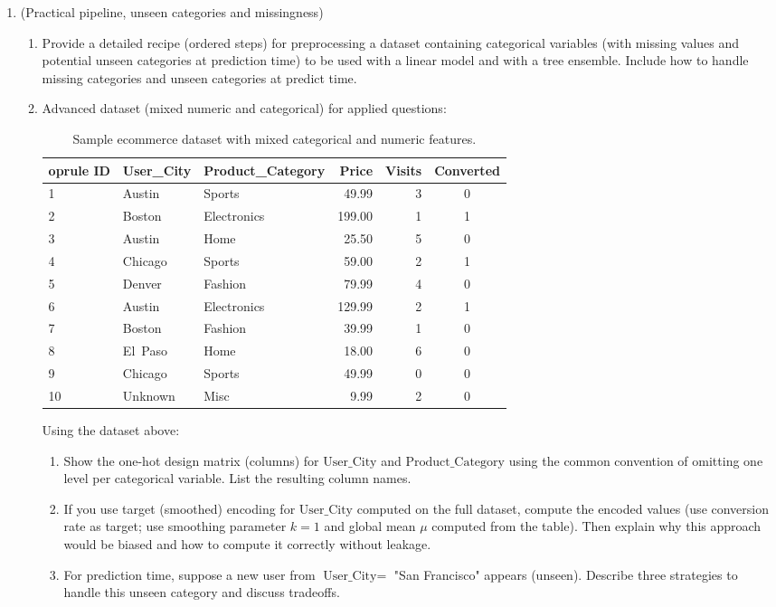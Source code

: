 \documentclass[12pt,a4paper]{article}
\begin{document}
\begin{enumerate}[label=(\arabic*)]
\item (Practical pipeline, unseen categories and missingness)
    \begin{enumerate}[label=(\alph*)]
    \item Provide a detailed recipe (ordered steps) for preprocessing a dataset containing categorical variables (with missing values and potential unseen categories at prediction time) to be used with a linear model and with a tree ensemble. Include how to handle missing categories and unseen categories at predict time.
    \item Advanced dataset (mixed numeric and categorical) for applied questions:
    \begin{table}[H]
    \centering
    \begin{tabular}{l l l r r c}
    	oprule
    ID & User\_City & Product\_Category & Price & Visits & Converted \\
    \midrule
    1 & Austin & Sports & 49.99 & 3 & 0 \\
    2 & Boston & Electronics & 199.00 & 1 & 1 \\
    3 & Austin & Home & 25.50 & 5 & 0 \\
    4 & Chicago & Sports & 59.00 & 2 & 1 \\
    5 & Denver & Fashion & 79.99 & 4 & 0 \\
    6 & Austin & Electronics & 129.99 & 2 & 1 \\
    7 & Boston & Fashion & 39.99 & 1 & 0 \\
    8 & El\ Paso & Home & 18.00 & 6 & 0 \\
    9 & Chicago & Sports & 49.99 & 0 & 0 \\
    10 & Unknown & Misc & 9.99 & 2 & 0 \\
    \bottomrule
    \end{tabular}
    \caption{Sample ecommerce dataset with mixed categorical and numeric features.}
    \end{table}
    Using the dataset above:
    \begin{enumerate}[label=(\roman*)]
    \item Show the one-hot design matrix (columns) for \(\text{User\_City}\) and \(\text{Product\_Category}\) using the common convention of omitting one level per categorical variable. List the resulting column names.
    \item If you use target (smoothed) encoding for \(\text{User\_City}\) computed on the full dataset, compute the encoded values (use conversion rate as target; use smoothing parameter \(k=1\) and global mean \(\mu\) computed from the table). Then explain why this approach would be biased and how to compute it correctly without leakage.
    \item For prediction time, suppose a new user from \(\text{User\_City} = \) "San Francisco" appears (unseen). Describe three strategies to handle this unseen category and discuss tradeoffs.
    \end{enumerate}
    \end{enumerate}
\end{enumerate}
\end{document}
